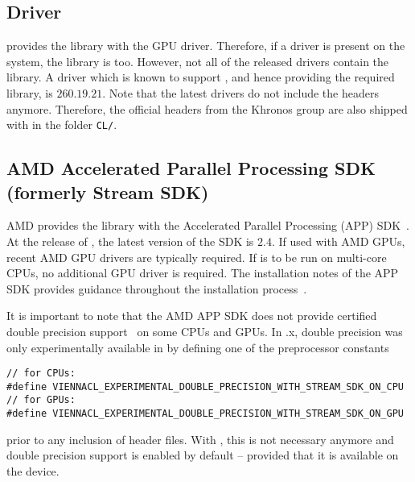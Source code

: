 \subsection{\NVIDIA Driver}
\NVIDIA provides the {\OpenCL} library with the GPU driver. Therefore, if a 
\NVIDIA driver is present on the system, the library is too. However, 
not all of the released drivers contain the {\OpenCL} library. 
A driver which is known to support {\OpenCL}, and hence providing the required
library, is $260.19.21$. Note that the latest {\NVIDIA} drivers do not include
the {\OpenCL} headers anymore. Therefore, the official {\OpenCL} headers from
the Khronos group \cite{khronoscl} are also shipped with {\ViennaCL} in the
folder \lstinline|CL/|.

\subsection{AMD Accelerated Parallel Processing SDK (formerly Stream SDK)} \label{sec:opencl-on-ati}
AMD provides the {\OpenCL} library with the Accelerated Parallel Processing (APP)
SDK~\cite{atistream}. At the release of {\ViennaCLversion}, the latest version of the
SDK is $2.4$. If used with AMD GPUs, recent AMD GPU drivers are typically required. If {\ViennaCL} is to be run on multi-core CPUs,
no additional GPU driver is required. The installation notes
of the APP SDK provides guidance throughout the
installation process~\cite{atistreamdocu}. 


It is important to note that the AMD APP SDK does not provide \OpenCL
certified double precision support~\cite{atidouble} on some CPUs and GPUs. In
.x, double precision was only experimentally available in
{\ViennaCL} by defining one of the preprocessor constants
\begin{lstlisting}
// for CPUs:
#define VIENNACL_EXPERIMENTAL_DOUBLE_PRECISION_WITH_STREAM_SDK_ON_CPU
// for GPUs:
#define VIENNACL_EXPERIMENTAL_DOUBLE_PRECISION_WITH_STREAM_SDK_ON_GPU
\end{lstlisting}
prior to any inclusion of {\ViennaCL} header files. With
{\ViennaCLminorversion}, this is not necessary anymore and double precision
support is enabled by default -- provided that it is available on the device.

